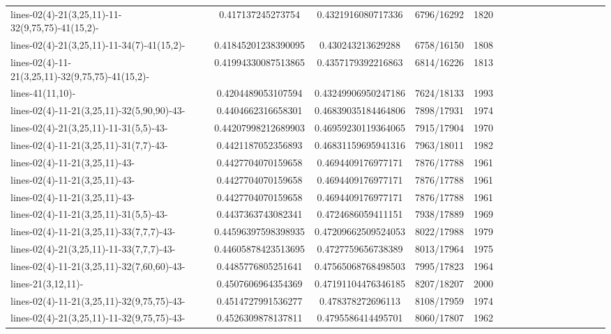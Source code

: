 \documentclass[12pt,oneside]{report}			%
\begin{document}
\begin{landscape}
\begin{longtable}{ | p{5cm} | *{15}{c|}}
lines-02(4)-21(3,25,11)-11-32(9,75,75)-41(15,2)-  & 0.417137245273754   & 0.4321916080717336  & 6796/16292  & 1820 \\
lines-02(4)-21(3,25,11)-11-34(7)-41(15,2)-        & 0.41845201238390095 & 0.430243213629288   & 6758/16150  & 1808 \\
lines-02(4)-11-21(3,25,11)-32(9,75,75)-41(15,2)-  & 0.41994330087513865 & 0.4357179392216863  & 6814/16226  & 1813 \\
lines-41(11,10)-                                  & 0.4204489053107594  & 0.43249906950247186 & 7624/18133  & 1993 \\
lines-02(4)-11-21(3,25,11)-32(5,90,90)-43-        & 0.4404662316658301  & 0.46839035184464806 & 7898/17931  & 1974 \\
lines-02(4)-21(3,25,11)-11-31(5,5)-43-            & 0.44207998212689903 & 0.46959230119364065 & 7915/17904  & 1970 \\
lines-02(4)-11-21(3,25,11)-31(7,7)-43-            & 0.4421187052356893  & 0.46831159695941316 & 7963/18011  & 1982 \\
lines-02(4)-11-21(3,25,11)-43-                    & 0.4427704070159658  & 0.4694409176977171  & 7876/17788  & 1961 \\
lines-02(4)-11-21(3,25,11)-43-                    & 0.4427704070159658  & 0.4694409176977171  & 7876/17788  & 1961 \\
lines-02(4)-11-21(3,25,11)-43-                    & 0.4427704070159658  & 0.4694409176977171  & 7876/17788  & 1961 \\
lines-02(4)-11-21(3,25,11)-31(5,5)-43-            & 0.4437363743082341  & 0.4724686059411151  & 7938/17889  & 1969 \\
lines-02(4)-11-21(3,25,11)-33(7,7,7)-43-         & 0.44596397598398935 & 0.47209662509524053 & 8022/17988  & 1979 \\
lines-02(4)-21(3,25,11)-11-33(7,7,7)-43-         & 0.44605878423513695 & 0.4727759656738389  & 8013/17964  & 1975 \\
lines-02(4)-11-21(3,25,11)-32(7,60,60)-43-        & 0.4485776805251641  & 0.47565068768498503 & 7995/17823  & 1964 \\
lines-21(3,12,11)-                                & 0.4507606964354369  & 0.47191104476346185 & 8207/18207  & 2000 \\
lines-02(4)-11-21(3,25,11)-32(9,75,75)-43-        & 0.4514727991536277  & 0.478378272696113   & 8108/17959  & 1974 \\
lines-02(4)-21(3,25,11)-11-32(9,75,75)-43-        & 0.4526309878137811  & 0.4795586414495701  & 8060/17807  & 1962 \\

\end{longtable}
\end{landscape}
\end{document}
